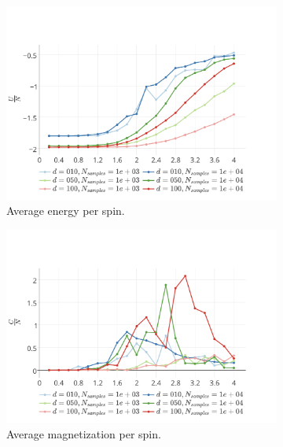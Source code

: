 	\begin{figure}
		\centering
		\begin{subfigure}{\columnwidth}
			\centering
			\includegraphics[width=\textwidth]{./img/2D/averageEnergy}
			\caption{Average energy per spin.}
			\label{fig:results:2D:averageEnergy}
		\end{subfigure}
		\begin{subfigure}{\columnwidth}
			\centering
			\includegraphics[width=\textwidth]{./img/2D/specificHeat}
			\caption{Average magnetization per spin.}
			\label{fig:results:2D:specificHeat}
		\end{subfigure}	
		\begin{subfigure}{\columnwidth}
			\centering

\end{subfigure}
\end{figure}
